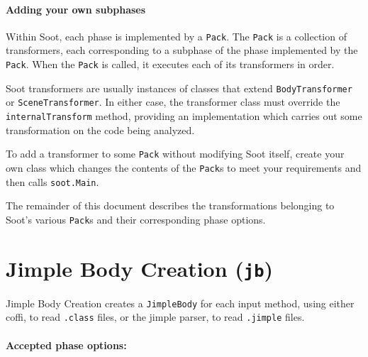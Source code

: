 \documentclass{article}
\begin{document}
\paragraph{Adding your own subphases}

\noindent
\par
Within Soot, each phase is implemented by a {\tt Pack}. The {\tt Pack}
is a collection of transformers, each corresponding to a subphase of
the phase implemented by the {\tt Pack}. When the {\tt Pack} is
called, it executes each of its transformers in order.

Soot transformers are usually instances of classes that extend 
{\tt BodyTransformer} or {\tt SceneTransformer}.  In either case, the
transformer class must override the {\tt internalTransform} method,
providing an implementation which carries out some transformation on
the code being analyzed.

To add a transformer to some {\tt Pack} without modifying Soot itself,
create your own class which changes the contents of the {\tt Pack}s to
meet your requirements and then calls {\tt soot.Main}.

\vspace{3ex}

The remainder of this document describes the transformations belonging
to Soot's various {\tt Pack}s and their corresponding phase
options.

\tableofcontents


\section{Jimple Body Creation ({\tt jb})}

Jimple Body Creation creates a {\tt JimpleBody} for each input
method, using either coffi, to read {\tt .class} files, or the
jimple parser, to read {\tt .jimple} files.


\paragraph{Accepted phase options:} 
\end{document}
